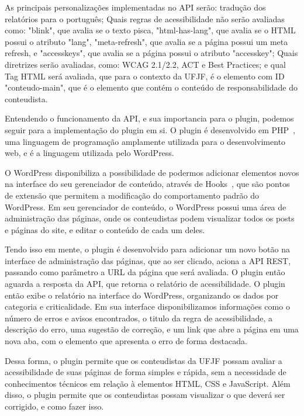 \documentclass[12pt]{article}
\begin{document}
As principais personalizações implementadas no API serão: 
tradução dos relatórios para o português; Quais regras de acessibilidade 
não serão avaliadas como: "blink", que avalia se o texto pisca, 
"html-has-lang", que avalia se o HTML possui o atributo
"lang", "meta-refresh", que avalia se a página possui um meta refresh, e
"accesskeys", que avalia se a página possui o atributo "accesskey"; Quais 
diretrizes serão avaliadas, como: WCAG 2.1/2.2, ACT e Best Practices; e qual
Tag HTML será avaliada, que para o contexto da UFJF, é o elemento com ID "conteudo-main",
que é o elemento que contém o conteúdo de responsabilidade do conteudista.

Entendendo o funcionamento da API, e sua importancia para o
plugin, podemos seguir para a implementação do plugin em si. O plugin
é desenvolvido em PHP~\autocite{php}, uma linguagem de programação amplamente utilizada
para o desenvolvimento web, e é a linguagem utilizada pelo WordPress. 

O WordPress disponibiliza a possibilidade de podermos adicionar elementos novos na interface
do seu gerenciador de conteúdo, através de Hooks~\autocite{hooks}, que são pontos
de extensão que permitem a modificação do comportamento padrão do WordPress. Em seu
gerenciador de conteúdo, o WordPress possui uma área de administração das páginas, onde
os conteudistas podem visualizar todos os posts e páginas do site, e editar o conteúdo
de cada um deles.

Tendo isso em mente, o plugin é desenvolvido para adicionar um novo botão na
interface de administração das páginas, que ao ser clicado, aciona a API REST,
passando como parâmetro a URL da página que será avaliada. O plugin então
aguarda a resposta da API, que retorna o relatório de acessibilidade. O plugin
então exibe o relatório na interface do WordPress, organizando os dados
por categoria e criticalidade. Em sua interface disponibilizamos informações 
como o número de erros e avisos encontrados,
o titulo da regra de acessibilidade, a descrição do erro, uma sugestão de correção,
e um link que abre a página em uma nova aba, com o elemento que apresenta o erro de 
forma destacada.

Dessa forma, o plugin permite que os conteudistas da UFJF possam avaliar a
acessibilidade de suas páginas de forma simples e rápida, sem a necessidade
de conhecimentos técnicos em relação à elementos HTML, CSS e JavaScript.
Além disso, o plugin permite que os conteudistas possam visualizar o que 
deverá ser corrigido, e como fazer isso.
\end{document}
